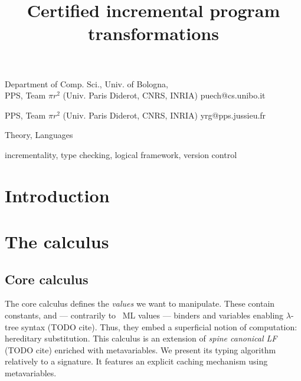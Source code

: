\documentclass[9pt]{sigplanconf}
\begin{document}
\copyrightdata{[to be supplied]}


\title{Certified incremental program transformations}

           {Department of Comp. Sci., Univ. of Bologna,\\
             PPS, Team $\pi r^2$ (Univ. Paris Diderot, CNRS, INRIA)}
           {puech@cs.unibo.it}

           {PPS, Team $\pi r^2$ (Univ. Paris Diderot, CNRS, INRIA)}
           {yrg@pps.jussieu.fr}

\maketitle

\begin{abstract}
\end{abstract}

 

\terms
Theory, Languages

\keywords
incrementality, type checking, logical framework, version control


\section{Introduction}

\section{The calculus}

\subsection{Core calculus}

The core calculus defines the \emph{values} we want to
manipulate. These contain constants, and --- contrarily to \eg\ ML
values --- binders and variables enabling $\lambda$-tree syntax (TODO
cite). Thus, they embed a superficial notion of computation:
hereditary substitution. This calculus is an extension of \emph{spine
  canonical LF} (TODO cite) enriched with metavariables. We present
its typing algorithm relatively to a signature. It features an
explicit caching mechanism using metavariables.
\end{document}
